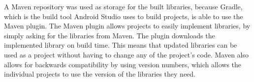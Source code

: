 A Maven repository was used as storage for the built libraries, because Gradle, which is the build tool Android Studio uses to build projects, is able to use the Maven plugin. The Maven plugin allows projects to easily implement libraries, by simply asking for the libraries from Maven. The plugin downloads the implemented library on build time. This means that updated libraries can be used as a project without having to change any of the project's code. Maven also allows for backwards compatibility by using version numbers, which allows the individual projects to use the version of the libraries they need.
